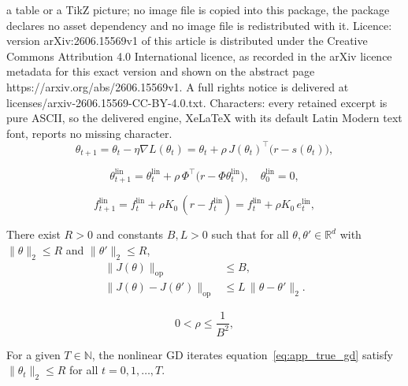 \documentclass[10pt,a4paper]{amsart}
\def\eqref#1{equation~\ref{#1}}
\begin{document}
a table or a TikZ picture; no image file is copied into this package, the package declares no asset dependency and no image file is redistributed with it. Licence: version arXiv:2606.15569v1 of this article is distributed under the Creative Commons Attribution 4.0 International licence, as recorded in the arXiv licence metadata for this exact version and shown on the abstract page https://arxiv.org/abs/2606.15569v1. A full rights notice is delivered at licenses/arxiv-2606.15569-CC-BY-4.0.txt. Characters: every retained excerpt is pure ASCII, so the delivered engine, XeLaTeX with its default Latin Modern text font, reports no missing character.
\begin{equation}
    \theta_{t+1} 
    =\theta_t-\eta\nabla L(\theta_t) 
    =\theta_t+\rho\,J(\theta_t)^\top\bigl(r-s(\theta_t)\bigr),
\label{eq:app_true_gd}
\end{equation}

\begin{equation}
    \theta_{t+1}^{\mathrm{lin}} 
    =\theta_t^{\mathrm{lin}}+\rho\,\Phi^\top\bigl(r-\Phi\theta_t^{\mathrm{lin}}\bigr), 
    \quad
    \theta_0^{\mathrm{lin}}=0,
    \label{eq:app_lin_gd}
\end{equation}

\begin{equation}
f_{t+1}^{\mathrm{lin}}=f_t^{\mathrm{lin}}+\rho K_0\,(r-f_t^{\mathrm{lin}})
=f_t^{\mathrm{lin}}+\rho K_0\,e_t^{\mathrm{lin}},
\label{eq:app_lin_kernel_recursion}
\end{equation}

\begin{assumption}
\label{assump:JL_local_app}
There exist $R>0$ and constants $B,L>0$ such that for all $\theta,\theta'\in\mathbb{R}^d$ with
$\|\theta\|_2\le R$ and $\|\theta'\|_2\le R$,
\begin{align}
\|J(\theta)\|_{\mathrm{op}} &\le B,
\label{eq:app_J_bounded}\\
\|J(\theta)-J(\theta')\|_{\mathrm{op}} &\le L\,\|\theta-\theta'\|_2.
\label{eq:app_J_Lipschitz}
\end{align}
\end{assumption}

\begin{equation}
    0<\rho\le \frac{1}{B^2},
\label{eq:app_rho_small}
\end{equation}

\begin{assumption}
\label{assump:iterate_stability_app}
For a given $T\in\mathbb{N}$, the nonlinear GD iterates \eqref{eq:app_true_gd} satisfy
$\|\theta_t\|_2\le R$ for all $t=0,1,\dots,T$.
\end{assumption}
\end{document}
